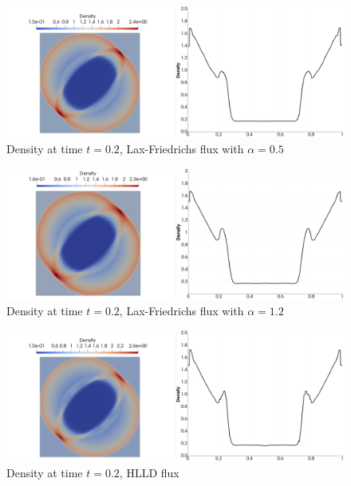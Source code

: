 	
	\begin{figure}[H]
		\begin{center}
			\includegraphics[width=\textwidth]{img/numflux/lf-05-1.jpg}
			\vspace{-3mm}
		\caption{Density at time $t = 0.2$, Lax-Friedrichs flux with $\alpha = 0.5$}
		\end{center}
		\label{numFluxCompare3}
	\end{figure}\vspace{-7mm}
	\begin{figure}[H]
		\begin{center}
			\includegraphics[width=\textwidth]{img/numflux/lf-10-1.jpg}
			\vspace{-3mm}
		\caption{Density at time $t = 0.2$, Lax-Friedrichs flux with $\alpha = 1.2$}
		\end{center}
		\label{numFluxCompare4}
	\end{figure}\vspace{-7mm}
	\begin{figure}[H]
		\begin{center}
			\includegraphics[width=\textwidth]{img/numflux/hl-1.jpg}
			\vspace{-3mm}
		\caption{Density at time $t = 0.2$, HLLD flux}
		\end{center}
		\label{numFluxCompare5}
	\end{figure}\vspace{-7mm}
	\newpage
	
